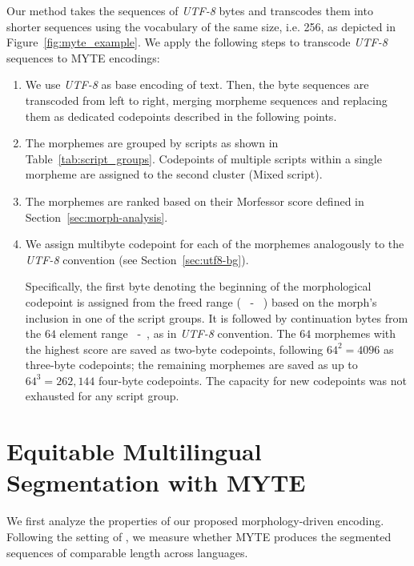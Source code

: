 Our method takes the sequences of \emph{UTF-8} bytes and transcodes them into shorter sequences using the vocabulary of the same size, i.e. 256, as depicted in Figure~\ref{fig:myte_example}. We apply the following steps to transcode \emph{UTF-8} sequences to \textsc{MYTE} encodings:

\begin{enumerate}

    \item We use \emph{UTF-8} as base encoding of text. Then, the byte sequences are transcoded from left to right, merging morpheme sequences and replacing them as dedicated codepoints described in the following points.
    \item The morphemes are grouped by scripts as shown in Table~\ref{tab:script_groups}.
    Codepoints of multiple scripts within a single morpheme are assigned to the second cluster (Mixed script).
    \item The morphemes are ranked based on their Morfessor score defined in Section~\ref{sec:morph-analysis}.
    \item We assign multibyte codepoint for each of the morphemes analogously to the \emph{UTF-8} convention (see Section~\ref{sec:utf8-bg}).

    Specifically, the first byte denoting the beginning of the morphological codepoint is assigned from the freed range (~ - ~) based on the morph's inclusion in one of the script groups. It is followed by continuation bytes from the $64$ element range  ~-~, as in \emph{UTF-8} convention. The $64$ morphemes with the highest score are saved as two-byte codepoints, following $64^2=4096$ as three-byte codepoints; the remaining morphemes are saved as up to $64^3=262,144$ four-byte codepoints. The capacity for new codepoints was not exhausted for any script group.

\end{enumerate}

\section{Equitable Multilingual Segmentation with \textsc{MYTE}}

We first analyze the properties of our proposed morphology-driven encoding. Following the setting of , we measure whether \textsc{MYTE} produces the segmented sequences of comparable length across languages. 

